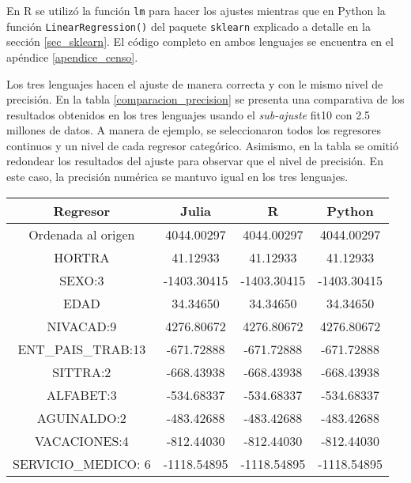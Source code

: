 En \textsf{R} se utilizó la función \texttt{lm} para hacer los ajustes mientras que en \textsf{Python} la función \texttt{LinearRegression()} del paquete \texttt{sklearn} explicado a detalle en la sección \ref{sec_sklearn}. El código completo en ambos lenguajes se encuentra en el apéndice \ref{apendice_censo}. 

Los tres lenguajes hacen el ajuste de manera correcta y con le mismo nivel de precisión. En la tabla \ref{comparacion_precision} se presenta una comparativa de los resultados obtenidos en los tres lenguajes usando el \textit{sub-ajuste} \textsf{fit10} con 2.5 millones de datos. A manera de ejemplo, se seleccionaron todos los regresores continuos y un nivel de cada regresor categórico. Asimismo, en la tabla se omitió redondear los resultados del ajuste para observar que el nivel de precisión. En este caso, la precisión numérica se mantuvo igual en los tres lenguajes. 

\begin{center}
	\begin{tabular}{|c|c|c|c|} 
		\hline
		Regresor & Julia & R  & Python  \\ 
		\hline 
		Ordenada al origen & 4044.00297 & 4044.00297 & 4044.00297 \\ 
		
		HORTRA & 41.12933 & 41.12933 & 41.12933 \\
		
		SEXO:3 & -1403.30415 & -1403.30415 & -1403.30415 \\ 
		
		EDAD & 34.34650 & 34.34650 & 34.34650 \\ 
		
		NIVACAD:9 & 4276.80672 & 4276.80672 & 4276.80672 \\
		
		ENT\_PAIS\_TRAB:13 & -671.72888 & -671.72888 & -671.72888 \\
		
		SITTRA:2 & -668.43938 & -668.43938 & -668.43938 \\
		
		ALFABET:3 & -534.68337 & -534.68337 & -534.68337 \\
		
		AGUINALDO:2 & -483.42688 & -483.42688 & -483.42688 \\
		
		VACACIONES:4 & -812.44030 & -812.44030 & -812.44030 \\
		
		SERVICIO\_MEDICO: 6 & -1118.54895 & -1118.54895 & -1118.54895 \\
		
		\hline
	\end{tabular} 
	 \label{comparacion_precision}
\end{center}

